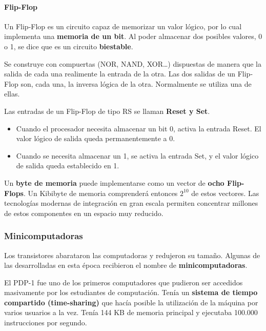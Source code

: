 \documentclass[spanish,a4paper,]{article}
\providecommand{\tightlist}{%
  \setlength{\itemsep}{0pt}\setlength{\parskip}{0pt}}
\let\oldparagraph\paragraph
\renewcommand{\paragraph}[1]{\oldparagraph{#1}\mbox{}}
\begin{document}
\hypertarget{flip-flop}{%
\paragraph{Flip-Flop}\label{flip-flop}}

Un Flip-Flop es un circuito capaz de memorizar un valor lógico, por lo
cual implementa una \textbf{memoria de un bit}. Al poder almacenar dos
posibles valores, 0 o 1, se dice que es un circuito \textbf{biestable}.

Se construye con compuertas (NOR, NAND, XOR\ldots{}) dispuestas de
manera que la salida de cada una realimente la entrada de la otra. Las
dos salidas de un Flip-Flop son, cada una, la inversa lógica de la otra.
Normalmente se utiliza una de ellas.

Las entradas de un Flip-Flop de tipo RS se llaman \textbf{Reset y Set}.

\begin{itemize}
\tightlist
\item
  Cuando el procesador necesita almacenar un bit 0, activa la entrada
  Reset. El valor lógico de salida queda permanentemente a 0.
\item
  Cuando se necesita almacenar un 1, se activa la entrada Set, y el
  valor lógico de salida queda establecido en 1.
\end{itemize}

Un \textbf{byte de memoria} puede implementarse como un vector de
\textbf{ocho Flip-Flops}. Un Kibibyte de memoria comprenderá entonces
\(2^{10}\) de estos vectores. Las tecnologías modernas de integración en
gran escala permiten concentrar millones de estos componentes en un
espacio muy reducido.

\hypertarget{minicomputadoras}{%
\subsubsection{Minicomputadoras}\label{minicomputadoras}}

Los transistores abarataron las computadoras y redujeron su tamaño.
Algunas de las desarrolladas en esta época recibieron el nombre de
\textbf{minicomputadoras}.

El PDP-1 fue uno de los primeros computadores que pudieron ser accedidos
masivamente por los estudiantes de computación. Tenía un \textbf{sistema
de tiempo compartido (time-sharing)} que hacía posible la utilización de
la máquina por varios usuarios a la vez. Tenía 144 KB de memoria
principal y ejecutaba 100.000 instrucciones por segundo.
\end{document}
